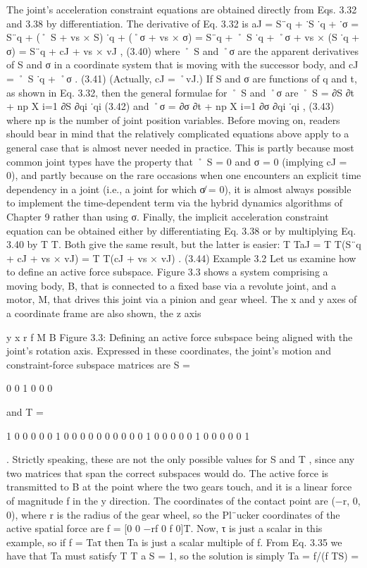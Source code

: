 The joint’s acceleration constraint equations are obtained directly from Eqs. 3.32 and 3.38 by differentiation. The derivative of Eq. 3.32 is aJ = S¨q + ˙S ˙q + ˙σ = S¨q + (˚ S + vs × S) ˙q + (˚σ + vs × σ) = S¨q + ˚ S ˙q + ˚σ + vs × (S ˙q + σ) = S¨q + cJ + vs × vJ , (3.40) where ˚ S and ˚σ are the apparent derivatives of S and σ in a coordinate system that is moving with the successor body, and cJ = ˚ S ˙q + ˚σ . (3.41) (Actually, cJ = ˚vJ.) If S and σ are functions of q and t, as shown in Eq. 3.32, then the general formulae for ˚ S and ˚σ are ˚ S = ∂S ∂t + np X i=1 ∂S ∂qi ˙qi (3.42) and ˚σ = ∂σ ∂t + np X i=1 ∂σ ∂qi ˙qi , (3.43) where np is the number of joint position variables. Before moving on, readers should bear in mind that the relatively complicated equations above apply to a general case that is almost never needed in practice. This is partly because most common joint types have the property that ˚ S = 0 and σ = 0 (implying cJ = 0), and partly because on the rare occasions when one encounters an explicit time dependency in a joint (i.e., a joint for which σ̸ = 0), it is almost always possible to implement the time-dependent term via the hybrid dynamics algorithms of Chapter 9 rather than using σ. Finally, the implicit acceleration constraint equation can be obtained either by differentiating Eq. 3.38 or by multiplying Eq. 3.40 by T T. Both give the same result, but the latter is easier: T TaJ = T T(S¨q + cJ + vs × vJ) = T T(cJ + vs × vJ) . (3.44) Example 3.2 Let us examine how to define an active force subspace. Figure 3.3 shows a system comprising a moving body, B, that is connected to a fixed base via a revolute joint, and a motor, M, that drives this joint via a pinion and gear wheel. The x and y axes of a coordinate frame are also shown, the z axis

y x r f M B Figure 3.3: Defining an active force subspace being aligned with the joint’s rotation axis. Expressed in these coordinates, the joint’s motion and constraint-force subspace matrices are S =

0 0 1 0 0 0

and T =

1 0 0 0 0 0 1 0 0 0 0 0 0 0 0 0 0 1 0 0 0 0 0 1 0 0 0 0 0 1

. Strictly speaking, these are not the only possible values for S and T , since any two matrices that span the correct subspaces would do. The active force is transmitted to B at the point where the two gears touch, and it is a linear force of magnitude f in the y direction. The coordinates of the contact point are (−r, 0, 0), where r is the radius of the gear wheel, so the Pl¨ucker coordinates of the active spatial force are f = [0 0 −rf 0 f 0]T. Now, τ is just a scalar in this example, so if f = Taτ then Ta is just a scalar multiple of f. From Eq. 3.35 we have that Ta must satisfy T T a S = 1, so the solution is simply Ta = f/(f TS) =

